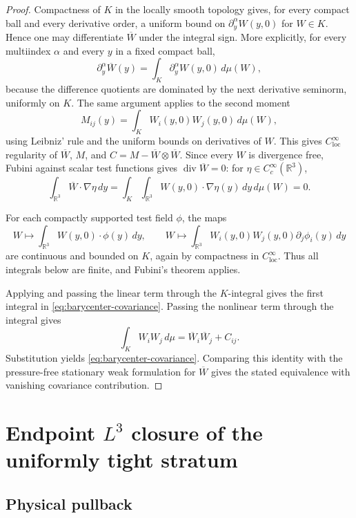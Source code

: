 \documentclass[11pt]{amsart}
\theoremstyle{plain}
\theoremstyle{definition}
\theoremstyle{remark}
\numberwithin{equation}{section}
\newcommand{\R}{\mathbb R}
\newcommand{\loc}{\mathrm{loc}}
\newcommand{\divergence}{\operatorname{div}}
\begin{document}
\begin{proof}
Compactness of \(K\) in the locally smooth topology gives, for every compact
ball and every derivative order, a uniform bound on
\(\partial_y^\alpha W(y,0)\) for \(W\in K\).  Hence one may differentiate
\(\overline W\) under the integral sign.  More explicitly, for every
multiindex \(\alpha\) and every \(y\) in a fixed compact ball,
\[
   \partial_y^\alpha\overline W(y)
   =
   \int_K\partial_y^\alpha W(y,0)\,d\mu(W),
\]
because the difference quotients are dominated by the next derivative
seminorm, uniformly on \(K\).  The same argument applies to the second moment
\[
   M_{ij}(y)=\int_KW_i(y,0)W_j(y,0)\,d\mu(W),
\]
using Leibniz' rule and the uniform bounds on derivatives of \(W\).  This
gives \(C^\infty_{\loc}\) regularity of \(\overline W\), \(M\), and
\(C=M-\overline W\otimes\overline W\).  Since every \(W\) is divergence free,
Fubini against scalar test functions gives \(\divergence\overline W=0\):
for \(\eta\in C_c^\infty(\R^3)\),
\[
   \int_{\R^3}\overline W\cdot\nabla\eta\,dy
   =
   \int_K\int_{\R^3}W(y,0)\cdot\nabla\eta(y)\,dy\,d\mu(W)=0.
\]

For each compactly supported test field \(\phi\), the maps
\[
   W\mapsto\int_{\R^3}W(y,0)\cdot\phi(y)\,dy,
   \qquad
   W\mapsto\int_{\R^3}W_i(y,0)W_j(y,0)\partial_j\phi_i(y)\,dy
\]
are continuous and bounded on \(K\), again by compactness in
\(C^\infty_{\loc}\).  Thus all integrals below are finite, and Fubini's theorem
applies.

Applying  and passing the linear term through
the \(K\)-integral gives the first integral in
\eqref{eq:barycenter-covariance}.  Passing the nonlinear term through the
integral gives
\[
   \int_K W_iW_j\,d\mu
   =
   \overline W_i\overline W_j+C_{ij}.
\]
Substitution yields \eqref{eq:barycenter-covariance}.  Comparing this identity
with the pressure-free stationary weak formulation for \(\overline W\) gives
the stated equivalence with vanishing covariance contribution.
\end{proof}

\section{\texorpdfstring{Endpoint \(L^3\) closure of the uniformly tight stratum}{Endpoint L3 closure of the uniformly tight stratum}}
\label{sec:endpoint-L3-closure}

\subsection{Physical pullback}
\end{document}
